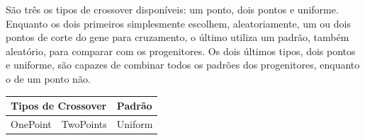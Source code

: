 \documentclass[12pt]{article}
\begin{document}
São três os tipos de crossover disponíveis: um ponto, dois pontos e uniforme. Enquanto os dois primeiros simplesmente escolhem, aleatoriamente, um ou dois pontos de corte do gene para cruzamento, o último utiliza um padrão, também aleatório, para comparar com os progenitores. Os dois últimos tipos, dois pontos e uniforme, são capazes de combinar todos os padrões dos progenitores, enquanto o de um ponto não.

\begin{table}[H]
	\centering
	\begin{tabular}{|l|l|l|}
		\hline
		\multicolumn{2}{|l|}{Tipos de Crossover}&Padrão \\ \hline
		OnePoint    & TwoPoints    & Uniform    \\ \hline
	\end{tabular}
\end{table}
	
	 
	
\end{document}
